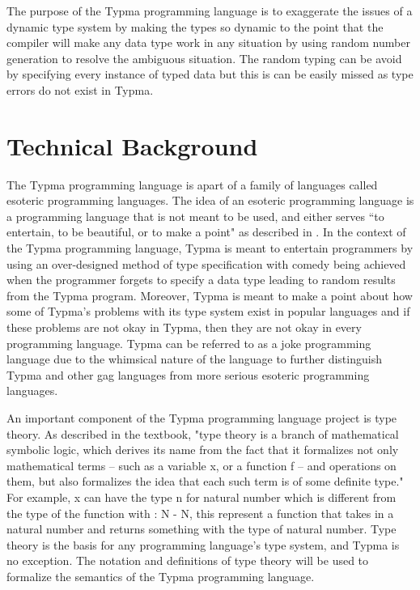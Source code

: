 \documentclass[10pt,twocolumn]{article}
\begin{document}
The purpose of the Typma programming language is to exaggerate the issues of a dynamic type system by making the types so dynamic to the point that the compiler will make any data type work in any situation by using random number generation to resolve the ambiguous situation. The random typing can be avoid by specifying every instance of typed data but this is can be easily missed as type errors do not exist in Typma.

\section{Technical Background}

The Typma programming language is apart of a family of languages called esoteric programming languages. The idea of an esoteric programming language is a programming language that is not meant to be used, and either serves ``to
entertain, to be beautiful, or to make a point" as described in \textcite{Morr2014Esoteric}. In the context of the Typma programming language, Typma is meant to entertain programmers by using an over-designed method of type specification with comedy being achieved when the programmer forgets to specify a data type leading to random results from the Typma program. Moreover, Typma is meant to make a point about how some of Typma's problems with its type system exist in popular languages and if these problems are not okay in Typma, then they are not okay in every programming language. Typma can be referred to as a joke programming language due to the whimsical nature of the language to further distinguish Typma and other gag languages from more serious esoteric programming languages.

An important component of the Typma programming language project is type theory. As described in the textbook, "type theory is a branch of mathematical symbolic logic, which derives its name from the fact that it formalizes not only mathematical terms – such as a variable x, or a function f – and operations on them, but also formalizes the idea that each such term is of some definite type." For example, x can have the type n for natural number which is different from the type of the function with : N -\> N, this represent a function that takes in a natural number and returns something with the type of natural number. Type theory is the basis for any programming language's type system, and Typma is no exception. The notation and definitions of type theory will be used to formalize the semantics of the Typma programming language.
\end{document}
